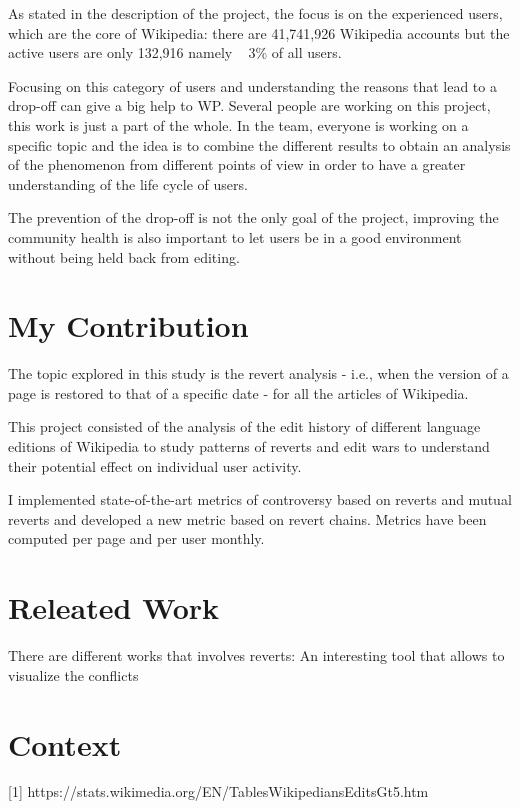 As stated in the description of the project, the focus is on the experienced users, which are the core of Wikipedia: there are 
41,741,926 Wikipedia accounts but the active users are only 132,916 namely  ~ 3\% of all users. 

Focusing on this category of users and understanding the reasons that lead to a drop-off can give a big help to WP. 
Several people are working on this project, this work is just a part of the whole.
In the team, everyone is working on a specific topic and the idea is to combine the different results to obtain an analysis of the
phenomenon from different points of view in order to have a greater understanding of the life cycle of users.  

The prevention of the drop-off is not the only goal of the project, improving the community health is also important to let users be
in a good environment without being held back from editing. 

\section{My Contribution}
\label{sec:project}
The topic explored in this study is the revert analysis - i.e., when the version of a page is restored to that of a specific date -
for all the articles of Wikipedia.


This project consisted of the analysis of the edit history of different language editions of Wikipedia to study patterns of reverts 
and edit wars to understand their potential effect on individual user activity.

I implemented state-of-the-art metrics of controversy based on reverts and mutual reverts and developed a new
metric based on revert chains. Metrics have been computed per page and per user monthly.
\section{Releated Work}
There are different works that involves reverts: 
An interesting tool that allows to visualize the conflicts 
\section{Context}
\label{sec:context}

\cite{pippo}




[1] https://stats.wikimedia.org/EN/TablesWikipediansEditsGt5.htm \\